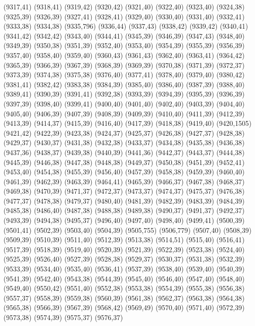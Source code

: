 (9317,41)
(9318,41)
(9319,42)
(9320,42)
(9321,40)
(9322,40)
(9323,40)
(9324,38)
(9325,39)
(9326,39)
(9327,41)
(9328,41)
(9329,40)
(9330,40)
(9331,40)
(9332,41)
(9333,38)
(9334,38)
(9335,796)
(9336,44)
(9337,43)
(9338,42)
(9339,42)
(9340,41)
(9341,42)
(9342,42)
(9343,40)
(9344,41)
(9345,39)
(9346,39)
(9347,43)
(9348,40)
(9349,39)
(9350,38)
(9351,39)
(9352,40)
(9353,40)
(9354,39)
(9355,39)
(9356,39)
(9357,40)
(9358,40)
(9359,40)
(9360,43)
(9361,43)
(9362,40)
(9363,41)
(9364,42)
(9365,39)
(9366,39)
(9367,39)
(9368,39)
(9369,39)
(9370,38)
(9371,39)
(9372,37)
(9373,39)
(9374,38)
(9375,38)
(9376,40)
(9377,41)
(9378,40)
(9379,40)
(9380,42)
(9381,41)
(9382,42)
(9383,38)
(9384,39)
(9385,40)
(9386,40)
(9387,39)
(9388,40)
(9389,41)
(9390,39)
(9391,41)
(9392,38)
(9393,39)
(9394,39)
(9395,39)
(9396,39)
(9397,39)
(9398,40)
(9399,41)
(9400,40)
(9401,40)
(9402,40)
(9403,39)
(9404,40)
(9405,40)
(9406,39)
(9407,39)
(9408,39)
(9409,39)
(9410,40)
(9411,39)
(9412,39)
(9413,39)
(9414,37)
(9415,39)
(9416,40)
(9417,39)
(9418,38)
(9419,40)
(9420,1505)
(9421,42)
(9422,39)
(9423,38)
(9424,37)
(9425,37)
(9426,38)
(9427,37)
(9428,38)
(9429,37)
(9430,37)
(9431,38)
(9432,38)
(9433,37)
(9434,38)
(9435,38)
(9436,38)
(9437,36)
(9438,37)
(9439,38)
(9440,39)
(9441,36)
(9442,37)
(9443,37)
(9444,38)
(9445,39)
(9446,38)
(9447,38)
(9448,38)
(9449,37)
(9450,38)
(9451,39)
(9452,41)
(9453,40)
(9454,38)
(9455,39)
(9456,40)
(9457,39)
(9458,38)
(9459,39)
(9460,40)
(9461,39)
(9462,39)
(9463,39)
(9464,41)
(9465,39)
(9466,37)
(9467,38)
(9468,37)
(9469,38)
(9470,39)
(9471,37)
(9472,37)
(9473,37)
(9474,37)
(9475,37)
(9476,38)
(9477,37)
(9478,38)
(9479,37)
(9480,40)
(9481,39)
(9482,39)
(9483,39)
(9484,39)
(9485,38)
(9486,40)
(9487,38)
(9488,38)
(9489,38)
(9490,37)
(9491,37)
(9492,37)
(9493,39)
(9494,38)
(9495,37)
(9496,40)
(9497,40)
(9498,40)
(9499,41)
(9500,39)
(9501,41)
(9502,39)
(9503,40)
(9504,39)
(9505,755)
(9506,779)
(9507,40)
(9508,39)
(9509,39)
(9510,39)
(9511,40)
(9512,39)
(9513,38)
(9514,51)
(9515,40)
(9516,41)
(9517,39)
(9518,39)
(9519,40)
(9520,39)
(9521,39)
(9522,39)
(9523,38)
(9524,40)
(9525,39)
(9526,40)
(9527,39)
(9528,38)
(9529,37)
(9530,37)
(9531,38)
(9532,39)
(9533,39)
(9534,40)
(9535,40)
(9536,41)
(9537,39)
(9538,40)
(9539,40)
(9540,39)
(9541,39)
(9542,40)
(9543,38)
(9544,39)
(9545,40)
(9546,40)
(9547,40)
(9548,40)
(9549,40)
(9550,42)
(9551,40)
(9552,38)
(9553,38)
(9554,39)
(9555,38)
(9556,38)
(9557,37)
(9558,39)
(9559,38)
(9560,39)
(9561,38)
(9562,37)
(9563,38)
(9564,38)
(9565,38)
(9566,39)
(9567,39)
(9568,42)
(9569,49)
(9570,40)
(9571,40)
(9572,39)
(9573,38)
(9574,39)
(9575,37)
(9576,37)
